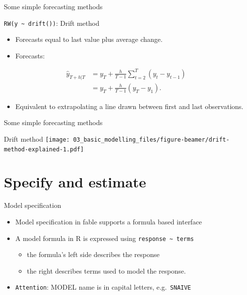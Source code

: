 \documentclass[
  14pt,
  ignorenonframetext,
  aspectratio=169,
]{beamer}
\providecommand{\tightlist}{%
  \setlength{\itemsep}{0pt}\setlength{\parskip}{0pt}}\usepackage{longtable,booktabs,array}
\begin{document}
\begin{frame}[fragile]{Some simple forecasting methods}
\protect\hypertarget{some-simple-forecasting-methods-6}{}
\fontsize{13}{14}\sf

\begin{block}{\texttt{RW(y\ \textasciitilde{}\ drift())}: Drift method}
\protect\hypertarget{rwy-drift-drift-method}{}
\begin{itemize}
\tightlist
\item
  Forecasts equal to last value plus average change.
\item
  Forecasts:\vspace*{-.7cm}
\end{itemize}

\begin{align*}
 \hat{y}_{T+h|T} & =  y_{T} + \frac{h}{T-1}\sum_{t=2}^T (y_t-y_{t-1})\\
                 & = y_T + \frac{h}{T-1}(y_T -y_1).
 \end{align*}\vspace*{-0.2cm}

\begin{itemize}
\tightlist
\item
  Equivalent to extrapolating a line drawn between first and last
  observations.
\end{itemize}
\end{block}
\end{frame}

\begin{frame}{Some simple forecasting methods}
\protect\hypertarget{some-simple-forecasting-methods-7}{}
\begin{block}{Drift method}
\protect\hypertarget{drift-method}{}
\texttt{[image: 03\_basic\_modelling\_files/figure-beamer/drift-method-explained-1.pdf]}
\end{block}
\end{frame}

\hypertarget{specify-and-estimate}{%
\section{Specify and estimate}\label{specify-and-estimate}}

\begin{frame}[fragile]{Model specification}
\protect\hypertarget{model-specification}{}
\begin{itemize}
\tightlist
\item
  Model specification in fable supports a formula based interface
\item
  A model formula in R is expressed using
  \texttt{response\ \textasciitilde{}\ terms}

  \begin{itemize}
  \tightlist
  \item
    the formula's left side describes the response
  \item
    the right describes terms used to model the response.
  \end{itemize}
\item
  \texttt{Attention}: MODEL name is in capital letters,
  e.g.~\texttt{SNAIVE}
\end{itemize}
\end{frame}
\end{document}
